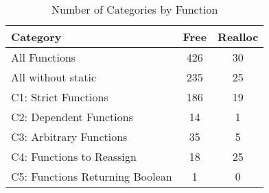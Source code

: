 \begin{table}[H]
   \centering
   \begin{tabularx}{0.7\linewidth}{l|c|c}

      Category & Free & Realloc \\
      \hline

      All Functions& 426 & 30 \\

      All without static& 235 & 25 \\

\hline
      C1: Strict Functions& 186 & 19 \\

      C2: Dependent Functions& 14 & 1 \\

      C3: Arbitrary Functions& 35 & 5 \\

      C4: Functions to Reassign& 18 & 25 \\

      C5: Functions Returning Boolean& 1 & 0 \\

   \end{tabularx}
   \caption{Number of Categories by Function}
   \label{tab:categories:overview}
\end{table}

